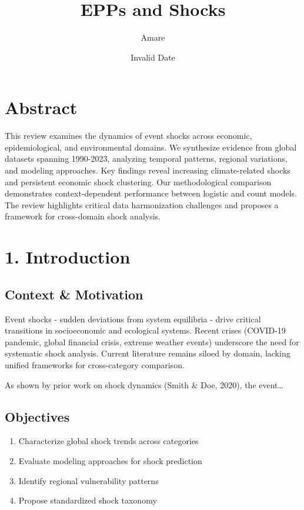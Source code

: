 \documentclass[
]{article}
\title{EPPs and Shocks}
\author{Amare}
\date{Invalid Date}
\begin{document}
\maketitle


\section{Abstract}\label{abstract}

This review examines the dynamics of event shocks across economic,
epidemiological, and environmental domains. We synthesize evidence from
global datasets spanning 1990-2023, analyzing temporal patterns,
regional variations, and modeling approaches. Key findings reveal
increasing climate-related shocks and persistent economic shock
clustering. Our methodological comparison demonstrates context-dependent
performance between logistic and count models. The review highlights
critical data harmonization challenges and proposes a framework for
cross-domain shock analysis.

\section{1. Introduction}\label{introduction}

\subsection{Context \& Motivation}\label{context-motivation}

Event shocks - sudden deviations from system equilibria - drive critical
transitions in socioeconomic and ecological systems. Recent crises
(COVID-19 pandemic, global financial crisis, extreme weather events)
underscore the need for systematic shock analysis. Current literature
remains siloed by domain, lacking unified frameworks for cross-category
comparison.

As shown by prior work on shock dynamics (Smith \& Doe, 2020), the
event\ldots{}

\subsection{Objectives}\label{objectives}

\begin{enumerate}
\def\labelenumi{\arabic{enumi}.}
\item
  Characterize global shock trends across categories
\item
  Evaluate modeling approaches for shock prediction
\item
  Identify regional vulnerability patterns
\item
  Propose standardized shock taxonomy
\end{enumerate}
\end{document}
